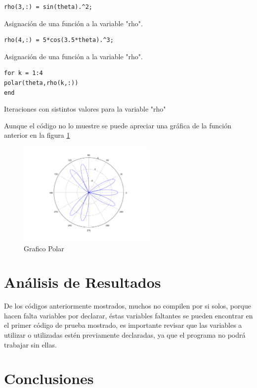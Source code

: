 \documentclass[]{article}
\begin{document}
\begin{verbatim}
rho(3,:) = sin(theta).^2;
\end{verbatim}
Asignación de una función a la variable "rho".

\begin{verbatim}
rho(4,:) = 5*cos(3.5*theta).^3;
\end{verbatim}
Asignación de una función a la variable "rho".

\begin{verbatim}
for k = 1:4
polar(theta,rho(k,:))           	
end	
\end{verbatim}
Iteraciones con sistintos valores para la variable "rho"

Aunque el código no lo muestre se puede apreciar una gráfica de la función anterior en la figura \ref{fig:petalos}

\begin{figure}[h!]
	\centering
	\includegraphics[width=0.6\textwidth]{flor.png}
	\caption{Grafico Polar}
	\label{fig:petalos}
\end{figure}

\section{Análisis de Resultados}

De los códigos anteriormente mostrados, muchos no compilen por si solos, porque hacen falta variables por declarar, éstas variables faltantes se pueden encontrar en el primer código de prueba mostrado, es importante revisar que las variables a utilizar o utilizadas estén previamente declaradas, ya que el programa no podrá trabajar sin ellas.\\

\section{Conclusiones}
\end{document}
